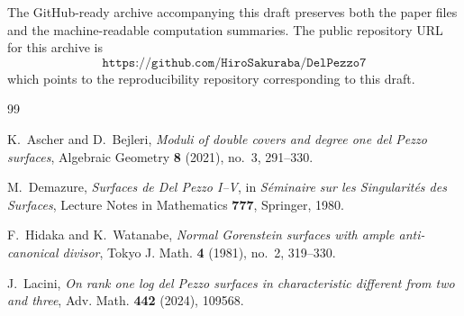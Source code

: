 \documentclass[11pt]{article}
\newcommand{\repourl}{\texttt{https://github.com/HiroSakuraba/DelPezzo7}}
\theoremstyle{definition}
\begin{document}
The GitHub-ready archive accompanying this draft preserves both the paper files and the machine-readable computation summaries. The public repository URL for this archive is
\[
\repourl
\]
which points to the reproducibility repository corresponding to this draft.

\begin{thebibliography}{99}

K.~Ascher and D.~Bejleri,
\emph{Moduli of double covers and degree one del Pezzo surfaces},
Algebraic Geometry \textbf{8} (2021), no.~3, 291--330.

M.~Demazure,
\emph{Surfaces de Del Pezzo I--V},
in \emph{S\'eminaire sur les Singularit\'es des Surfaces},
Lecture Notes in Mathematics \textbf{777}, Springer, 1980.

F.~Hidaka and K.~Watanabe,
\emph{Normal Gorenstein surfaces with ample anti-canonical divisor},
Tokyo J. Math. \textbf{4} (1981), no.~2, 319--330.

J.~Lacini,
\emph{On rank one log del Pezzo surfaces in characteristic different from two and three},
Adv. Math. \textbf{442} (2024), 109568.

\end{thebibliography}
\end{document}
